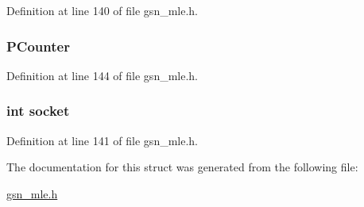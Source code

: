 Definition at line 140 of file gsn\_\-mle.h.

\hypertarget{a00151_afc197474be8f5aa37a053d6bbc27f28d}{
\subsubsection[{PCounter}]{ {\bf PCounter}}}
\label{a00151_afc197474be8f5aa37a053d6bbc27f28d}


Definition at line 144 of file gsn\_\-mle.h.

\hypertarget{a00151_a3666576f6b88007cc7b8f26c7da596c8}{
\subsubsection[{socket}]{\setlength{\rightskip}{0pt plus 5cm}int {\bf socket}}}
\label{a00151_a3666576f6b88007cc7b8f26c7da596c8}


Definition at line 141 of file gsn\_\-mle.h.



The documentation for this struct was generated from the following file:\begin{DoxyCompactItemize}
\item 
\hyperlink{a00527}{gsn\_\-mle.h}\end{DoxyCompactItemize}
